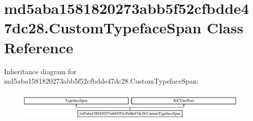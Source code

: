 \hypertarget{classmd5aba1581820273abb5f52cfbdde47dc28_1_1CustomTypefaceSpan}{}\section{md5aba1581820273abb5f52cfbdde47dc28.\+Custom\+Typeface\+Span Class Reference}
\label{classmd5aba1581820273abb5f52cfbdde47dc28_1_1CustomTypefaceSpan}
Inheritance diagram for md5aba1581820273abb5f52cfbdde47dc28.\+Custom\+Typeface\+Span\+:\begin{figure}[H]
\begin{center}
\leavevmode
\includegraphics[height=1.443299cm]{classmd5aba1581820273abb5f52cfbdde47dc28_1_1CustomTypefaceSpan}
\end{center}
\end{figure}

